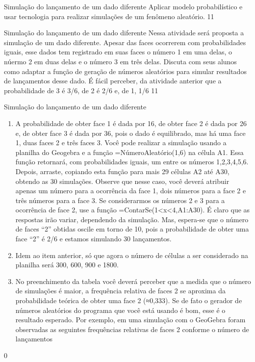\begin{objectives}{Simulação do lançamento de um dado diferente}
{
Aplicar modelo probabilístico e usar tecnologia para realizar simulações de um fenômeno aleatório.
}{1}{1}
\end{objectives}
\begin{sugestions}{Simulação do lançamento de um dado diferente}
{
Nessa atividade será proposta a simulação de um dado diferente. Apesar das faces ocorrerem com probabilidades iguais, esse dados tem registrado em suas faces o número 1 em uma delas, o núermo 2 em duas delas e o número 3 em três delas. Discuta com seus alunos como adaptar a função de geração de números aleatórios para simular resultados de lançamentos desse dado. É fácil perceber, da atividade anterior que a probabilidade de 3 é 3/6, de 2 é 2/6 e, de 1, 1/6
}{1}{1}
\end{sugestions}
\begin{answer}{Simulação do lançamento de um dado diferente}
{
\begin{enumerate}
\item A probabilidade de obter face 1 é dada por 16, de obter face 2 é dada por 26 e, de obter face 3 é dada por 36, pois o dado é equilibrado, mas há uma face 1, duas faces 2 e três faces 3.
Você pode realizar a simulação usando a planilha do Geogebra e a função =NúmeroAleatório(1,6) na célula A1. Essa função retornará, com probabilidades iguais, um entre os números 1,2,3,4,5,6. Depois, arraste, copiando esta função para mais 29 células A2 até A30, obtendo as 30 simulações. Observe que nesse caso, você deverá atribuir apenas um número para a ocorrência da face 1, dois números para a face 2 e três números para a face 3. Se considerarmos os números 2 e 3 para a ocorrência de face 2, use a função =ContarSe(1<x<4,A1:A30). É claro que as respostas irão variar, dependendo da simulação. Mas, espera-se que o número de faces “2” obtidas oscile em torno de 10, pois a probabilidade de obter uma face “2” é 2/6 e estamos simulando 30 lançamentos.

\item Idem ao item anterior, só que agora o número de células a ser considerado na planilha será 300, 600, 900 e 1800.

\item No preenchimento da tabela você deverá perceber que a medida que o número de simulações é maior, a frequência relativa de faces 2 se aproxima da probabilidade teórica de obter uma face 2 (≈0,333). Se de fato o gerador de números aleatórios do programa que você está usando é bom, esse é o resultado esperado. Por exemplo, em uma simulação com o GeoGebra foram observadas as seguintes frequências relativas de faces 2 conforme o número de lançamentos
\end{enumerate}
}{0}
\end{answer}

